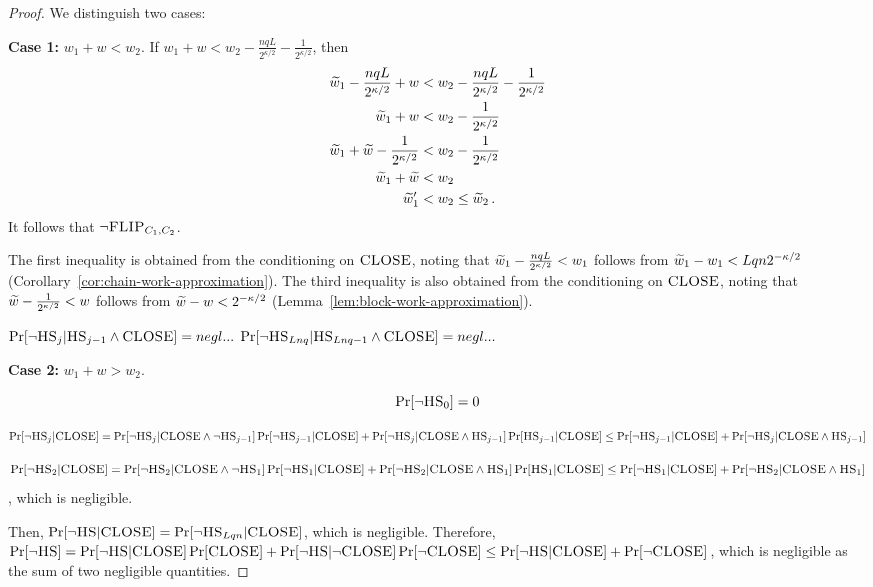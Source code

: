 \begin{proof}
  We distinguish two cases:

  \noindent
  \textbf{Case 1: } $w_1 + w < w_2$.
  If $w_1 + w < w_2 - \frac{nqL}{2^{\kappa/2}} - \frac{1}{2^{\kappa/2}}$,
  then
  \begin{align*}
    \widetilde{w}_1 - \frac{nqL}{2^{\kappa/2}} + w &< w_2 - \frac{nqL}{2^{\kappa/2}} - \frac{1}{2^{\kappa/2}}\\
    \widetilde{w}_1 + w &< w_2 - \frac{1}{2^{\kappa/2}}\\
    \widetilde{w}_1 + \widetilde{w} - \frac{1}{2^{\kappa/2}} &< w_2 - \frac{1}{2^{\kappa/2}}\\
    \widetilde{w}_1 + \widetilde{w} &< w_2 \\
    \widetilde{w}'_1 &< w_2 \leq \widetilde{w}_2\,.
  \end{align*}
  It follows that $\lnot \textsc{FLIP}_{C_1,C_2}$.

  The first inequality is obtained from the conditioning on $\textsc{CLOSE}$,
  noting that $\widetilde{w}_1 - \frac{nqL}{2^{\kappa/2}} < w_1$ follows from
  $\widetilde{w}_1 - w_1 < Lqn 2^{-\kappa/2}$ (Corollary~\ref{cor:chain-work-approximation}).
  The third inequality is also obtained from the conditioning on $\textsc{CLOSE}$,
  noting that $\widetilde{w} - \frac{1}{2^{\kappa/2}} < w$ follows from
  $\widetilde{w} - w < 2^{-\kappa/2}$ (Lemma~\ref{lem:block-work-approximation}).


  $\Pr[\lnot \textsc{HS}_j | \textsc{HS}_{j - 1} \land \textsc{CLOSE}] = negl...$
  $\Pr[\lnot \textsc{HS}_{Lnq} | \textsc{HS}_{Lnq - 1} \land \textsc{CLOSE}] = negl...$

  \noindent
  \textbf{Case 2: } $w_1 + w > w_2$.



  \[
    \Pr[\lnot \textsc{HS}_0] = 0
  \]

  \[
    \Pr[\lnot \textsc{HS}_j | \textsc{CLOSE}] = \Pr[\lnot \textsc{HS}_{j} | \textsc{CLOSE} \land \lnot \textsc{HS}_{j-1}] \Pr[\lnot \textsc{HS}_{j-1} | \textsc{CLOSE}]
    + \Pr[\lnot \textsc{HS}_{j} | \textsc{CLOSE} \land \textsc{HS}_{j-1}] \Pr[\textsc{HS}_{j-1} | \textsc{CLOSE}] \leq
    \Pr[\lnot \textsc{HS}_{j-1} | \textsc{CLOSE}] + \Pr[\lnot \textsc{HS}_{j} | \textsc{CLOSE} \land \textsc{HS}_{j-1}]
  \]

  \[
    \Pr[\lnot \textsc{HS}_{2} | \textsc{CLOSE}] = \Pr[\lnot \textsc{HS}_{2} | \textsc{CLOSE} \land \lnot \textsc{HS}_{1}] \Pr[\lnot \textsc{HS}_{1} | \textsc{CLOSE}] +
    \Pr[\lnot \textsc{HS}_{2} | \textsc{CLOSE} \land \textsc{HS}_{1}] \Pr[\textsc{HS}_{1} | \textsc{CLOSE}] \leq
    \Pr[\lnot \textsc{HS}_{1} | \textsc{CLOSE}] + \Pr[\lnot \textsc{HS}_{2} | \textsc{CLOSE} \land \textsc{HS}_{1}]
  \]
  , which is negligible.

  Then, $\Pr[\lnot \textsc{HS} | \textsc{CLOSE}] = \Pr[\lnot \textsc{HS}_{Lqn} | \textsc{CLOSE}]$, which is negligible.
  Therefore, $\Pr[\lnot \textsc{HS}] = \Pr[\lnot \textsc{HS} | \textsc{CLOSE}] \Pr[\textsc{CLOSE}] + \Pr[\lnot \textsc{HS} | \lnot \textsc{CLOSE}] \Pr[\lnot \textsc{CLOSE}] \leq \Pr[\lnot \textsc{HS} | \textsc{CLOSE}] + \Pr[\lnot \textsc{CLOSE}]$, which is negligible as the sum
  of two negligible quantities.
  \Qed
\end{proof}

